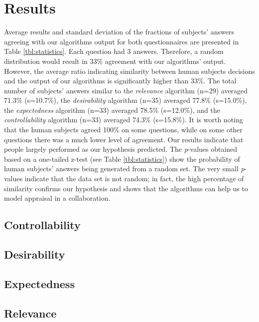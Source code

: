 \documentclass[12pt]{report}
\begin{document}
\section{Results}
\label{sec:results-crowdsourcing}
Average results and standard deviation of the fractions of subjects' answers
agreeing with our algorithms output for both questionnaires are presented in
Table \ref{tbl:statistics}. Each question had 3 answers. Therefore, a random
distribution would result in 33\% agreement with our algorithms' output.
However, the average ratio indicating similarity between human subjects
decisions and the output of our algorithms is significantly higher than 33\%.
The total number of subjects' answers similar to the \textit{relevance}
algorithm (n=29) averaged 71.3\% (s=10.7\%), the \textit{desirability}
algorithm (n=35) averaged 77.8\% (s=15.0\%), the \textit{expectedness}
algorithm (n=33) averaged 78.5\% (s=12.0\%), and the \textit{controllability}
algorithm (n=33) averaged 74.3\% (s=15.8\%). It is worth noting that the human
subjects agreed 100\% on some questions, while on some other questions there
was a much lower level of agreement. Our results indicate that people largely
performed as our hypothesis predicted. The \textit{p}-values obtained based on a
one-tailed z-test (see Table \ref{tbl:statistics}) show the probability of human
subjects' answers being generated from a random set. The very small
\textit{p}-values indicate that the data set is not random; in fact, the high
percentage of similarity confirms our hypothesis and shows that the algorithms
can help us to model appraisal in a collaboration.

\subsection{Controllability}
\label{sec:controllability-crowdsourcing}

\subsection{Desirability}
\label{sec:desirability-crowdsourcing}

\subsection{Expectedness}
\label{sec:expectedness-crowdsourcing}

\subsection{Relevance}
\label{sec:relevance-crowdsourcing}
\end{document}
